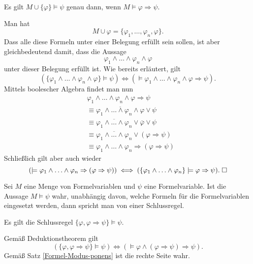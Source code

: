 \begin{Satz}[Deduktionstheorem]
Es gilt $M\cup\{\varphi\}\models\psi$ genau dann, wenn
$M\models\varphi\Rightarrow\psi$.
\end{Satz}
 Man hat
\begin{equation}
M\cup\varphi = \{\varphi_1,\ldots,\varphi_n,\varphi\}.
\end{equation}
Dass alle diese Formeln unter einer Belegung erfüllt sein sollen,
ist aber gleichbedeutend damit, dass die Aussage%
\begin{equation}
\varphi_1\land\ldots\land\varphi_n\land\varphi
\end{equation}
unter dieser Belegung erfüllt ist. Wie bereits erläutert, gilt%
\begin{equation}
(\{\varphi_1\land\ldots\land\varphi_n\land\varphi\}\models\psi)
\iff (\models \varphi_1\land\ldots\land\varphi_n\land\varphi\Rightarrow\psi).
\end{equation}
Mittels boolescher Algebra findet man nun
\begin{align}
& \varphi_1\land\ldots\land\varphi_n\land\varphi\Rightarrow\psi\\
& \equiv \overline{\varphi_1\land\ldots\land\varphi_n\land\varphi}\lor\psi\\
& \equiv \overline{\varphi_1\land\ldots\land\varphi_n}\lor\overline\varphi\lor\psi\\
& \equiv \overline{\varphi_1\land\ldots\land\varphi_n}\lor(\varphi\Rightarrow\psi)\\
& \equiv \varphi_1\land\ldots\land\varphi_n\Rightarrow (\varphi\Rightarrow\psi)
\end{align}
Schließlich gilt aber auch wieder
\begin{equation}
(\models \varphi_1\land\ldots\land\varphi_n\Rightarrow(\varphi\Rightarrow\psi))
\iff (\{\varphi_1\land\ldots\land\varphi_n\}\models\varphi\Rightarrow\psi).\;\Box
\end{equation}

\newpage
\begin{Definition}[Schlussregel]
Sei $M$ eine Menge von Formelvariablen und $\psi$ eine Formelvariable.
Ist die Aussage $M\models\psi$ wahr, unabhängig davon, welche
Formeln für die Formelvariablen eingesetzt werden, dann spricht man
von einer Schlussregel.
\end{Definition}

\begin{Satz}
Es gilt die Schlussregel $\{\varphi,\varphi\Rightarrow\psi\}\models\psi$.
\end{Satz}
 Gemäß Deduktionstheorem gilt
\[(\{\varphi,\varphi\Rightarrow\psi\}\models\psi)
\iff (\models \varphi\land(\varphi\Rightarrow\psi)\Rightarrow\psi).\]
Gemäß Satz \ref{Formel-Modus-ponens} ist die rechte
Seite wahr.\;\qedsymbol

